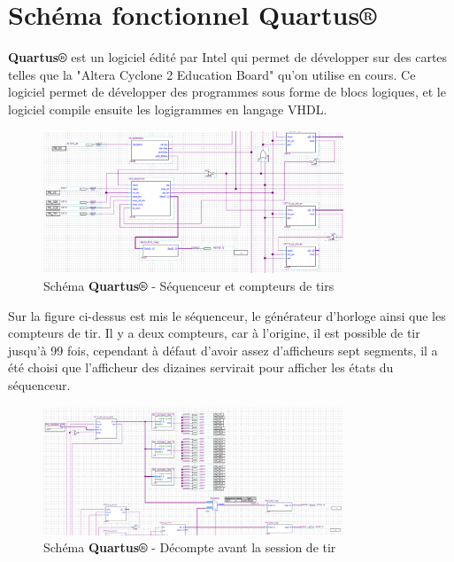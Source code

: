 \documentclass{rapport}
\begin{document}
\section{Schéma fonctionnel \textbf{Quartus®}}

\textbf{Quartus®} est un logiciel édité par Intel qui permet de développer sur des cartes telles que la "Altera Cyclone 2 Education Board" qu'on utilise en cours. Ce logiciel permet de développer des programmes sous forme de blocs logiques, et le logiciel compile ensuite les logigrammes en langage VHDL.


\begin{figure}[h!]

    \centering

    \includegraphics[width=0.8\textwidth]{src/seq_n_tirs_part.png}

    \caption{Schéma \textbf{Quartus®} - Séquenceur et compteurs de tirs}

    \label{fig:functional_diagram}

\end{figure}

Sur la figure ci-dessus est mis le séquenceur, le générateur d'horloge ainsi que les compteurs de tir. Il y a deux compteurs, car à l'origine, il est possible de tir jusqu’à 99 fois, cependant à défaut d'avoir assez d'afficheurs sept segments, il a été choisi que l'afficheur des dizaines servirait pour afficher les états du séquenceur.

\begin{figure}[h!]

    \centering

    \includegraphics[width=0.8\textwidth]{src/decompte_part.png}

    \caption{Schéma \textbf{Quartus®} - Décompte avant la session de tir}

    \label{fig:functional_diagram}

\end{figure}
\end{document}
